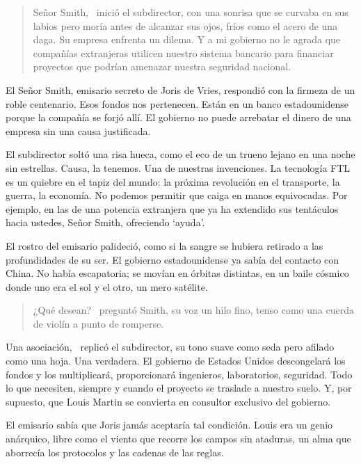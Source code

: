 \begin{quote}
\calligra
\glqq Señor Smith,\grqq~ inició el subdirector, con una sonrisa que se curvaba en sus labios pero moría antes de alcanzar sus ojos, fríos como el acero de una daga. \glqq Su empresa enfrenta un dilema. Y a mi gobierno no le agrada que compañías extranjeras utilicen nuestro sistema bancario para financiar proyectos que podrían amenazar nuestra seguridad nacional.\grqq
\end{quote}

El \glqq Señor Smith\grqq, emisario secreto de Joris de Vries, respondió con la firmeza de un roble centenario. \glqq Esos fondos nos pertenecen. Están en un banco estadounidense porque la compañía se forjó allí. El gobierno no puede arrebatar el dinero de una empresa sin una causa justificada.\grqq

El subdirector soltó una risa hueca, como el eco de un trueno lejano en una noche sin estrellas. \glqq Causa, la tenemos. Una de nuestras invenciones. La tecnología FTL es un quiebre en el tapiz del mundo: la próxima revolución en el transporte, la guerra, la economía. No podemos permitir que caiga en manos equivocadas. Por ejemplo, en las de una potencia extranjera que ya ha extendido sus tentáculos hacia ustedes, Señor Smith, ofreciendo `ayuda'.\grqq

El rostro del emisario palideció, como si la sangre se hubiera retirado a las profundidades de su ser. El gobierno estadounidense ya sabía del contacto con China. No había escapatoria; se movían en órbitas distintas, en un baile cósmico donde uno era el sol y el otro, un mero satélite.

\begin{quote}
\calligra
\glqq ¿Qué desean?\grqq~ preguntó Smith, su voz un hilo fino, tenso como una cuerda de violín a punto de romperse.
\end{quote}

\glqq Una asociación,\grqq~ replicó el subdirector, su tono suave como seda pero afilado como una hoja. \glqq Una verdadera. El gobierno de Estados Unidos descongelará los fondos y los multiplicará, proporcionará ingenieros, laboratorios, seguridad. Todo lo que necesiten, siempre y cuando el proyecto se traslade a nuestro suelo. Y, por supuesto, que Louis Martin se convierta en consultor exclusivo del gobierno.\grqq

El emisario sabía que Joris jamás aceptaría tal condición. Louis era un genio anárquico, libre como el viento que recorre los campos sin ataduras, un alma que aborrecía los protocolos y las cadenas de las reglas.

